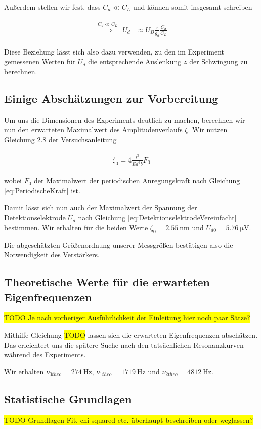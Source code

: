 Außerdem stellen wir fest, dass $C_d \ll C_L$ und können somit insgesamt schreiben

\begin{align}
    \label{eq:DetektionselektrodeVereinfacht}
    \begin{split}
        \overset{C_d \ll C_L}{\implies} ~~ U_d &\approx U_B \frac{z}{g_d} \frac{C_d}{C_L}
    \end{split}
\end{align}

Diese Beziehung lässt sich also dazu verwenden, zu den im Experiment gemessenen Werten für $U_d$ die entsprechende Auslenkung $z$ der Schwingung zu berechnen.

\subsection{Einige Abschätzungen zur Vorbereitung}

Um uns die Dimensionen des Experiments deutlich zu machen, berechnen wir nun den erwarteten Maximalwert des Amplitudenverlaufs $\zeta$.
Wir nutzen Gleichung 2.8 der Versuchsanleitung

\begin{align}
    \label{eq:MaximaleAmplitude}
    \begin{split}
        \zeta_0 = 4 \frac{l^3}{Ed^3b} F_0
    \end{split}
\end{align}

wobei $F_0$ der Maximalwert der periodischen Anregungskraft nach Gleichung \ref{eq:PeriodischeKraft} ist.

Damit lässt sich nun auch der Maximalwert der Spannung der Detektionselektrode $U_d$ nach Gleichung \ref{eq:DetektionselektrodeVereinfacht} bestimmen.
Wir erhalten für die beiden Werte $\zeta_0 = \SI{2.55}{\nano\meter}$ und $U_{d0} = \SI{5.76}{\micro\volt}$.

Die abgeschätzten Größenordnung unserer Messgrößen bestätigen also die Notwendigkeit des Verstärkers.

\subsection{Theoretische Werte für die erwarteten Eigenfrequenzen}

\colorbox{yellow}{TODO Je nach vorheriger Ausführlichkeit der Einleitung hier noch paar Sätze?}

Mithilfe Gleichung \colorbox{yellow}{TODO} lassen sich die erwarteten Eigenfrequenzen abschätzen.
Das erleichtert uns die spätere Suche nach den tatsächlichen Resonanzkurven während des Experiments.

Wir erhalten $\nu_{0 theo} = \SI{274}{\hertz}$, $\nu_{1 theo} = \SI{1719}{\hertz}$ und $\nu_{2 theo} = \SI{4812}{\hertz}$.

\subsection{Statistische Grundlagen}

\colorbox{yellow}{TODO Grundlagen Fit, chi-squared etc. überhaupt beschreiben oder weglassen?}
